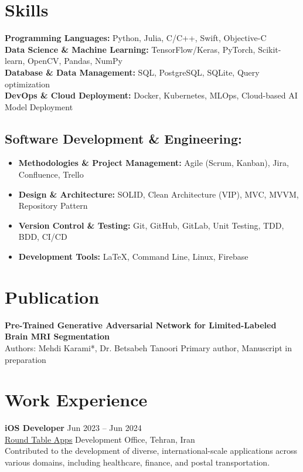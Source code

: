 \documentclass[letter,10pt]{article}
\newcommand{\customsquare}{\raisebox{0.25ex}{\scalebox{0.45}{$\blacksquare$}}}
\begin{document}
\section*{Skills}
\textbf{Programming Languages:} Python, Julia, C/C++, Swift, Objective-C \\ [5pt]
\textbf{Data Science \& Machine Learning:} TensorFlow/Keras, PyTorch, Scikit-learn, OpenCV, Pandas, NumPy \\ [5pt]
\textbf{Database \& Data Management:} SQL, PostgreSQL, SQLite, Query optimization \\ [5pt]
\textbf{DevOps \& Cloud Deployment:} Docker, Kubernetes, MLOps, Cloud-based AI Model Deployment \\ [-20pt]

\subsection*{Software Development \& Engineering:}
\vspace{5pt}
\begin{itemize}[label={\customsquare}]
    \item \textbf{Methodologies \& Project Management:} Agile (Scrum, Kanban), Jira, Confluence, Trello
    \item \textbf{Design \& Architecture:} SOLID, Clean Architecture (VIP), MVC, MVVM, Repository Pattern
    \item \textbf{Version Control \& Testing:} Git, GitHub, GitLab, Unit Testing, TDD, BDD, CI/CD
    \item \textbf{Development Tools:} LaTeX, Command Line, Linux, Firebase
\end{itemize}

\section*{Publication}
\textbf{Pre-Trained Generative Adversarial Network for Limited-Labeled Brain MRI Segmentation} \\ [5pt]
Authors: Mehdi Karami*, Dr. Betsabeh Tanoori \hfill *Primary author, Manuscript in preparation

\section*{Work Experience}
\textbf{iOS Developer} \hfill Jun 2023 -- Jun 2024 \\ [3pt]
\href{https://roundtableapps.com}{\underline{Round Table Apps}} \hfill Development Office, Tehran, Iran \\ [8pt]
Contributed to the development of diverse, international-scale applications across various domains, including healthcare, finance, and postal transportation.
\end{document}
